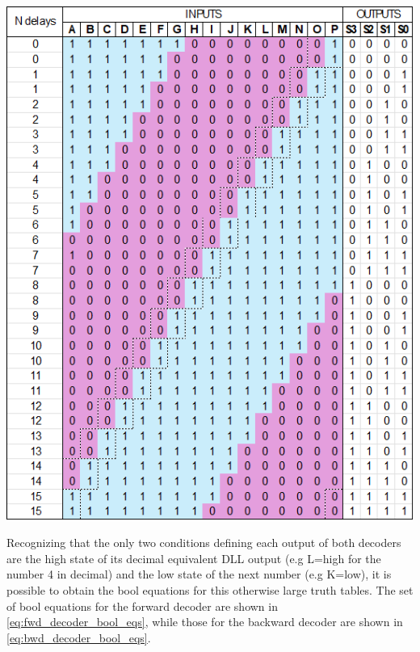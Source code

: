 \begin{minipage}{0.48\textwidth}
    \centering
    \includegraphics[width=1\textwidth]{figures/bwd_truth_table.png}
    \label{tab:bwd_truth_table}
\end{minipage}

Recognizing that the only two conditions defining each output of both decoders are the high state of its decimal equivalent DLL output (e.g L=high for the number 4 in decimal) and the low state of the next number
(e.g K=low), it is possible to obtain the bool equations for this otherwise large truth tables. The set of bool equations for the forward decoder are shown in \ref{eq:fwd_decoder_bool_eqs}, while those for
the backward decoder are shown in \ref{eq:bwd_decoder_bool_eqs}.

\vspace{1cm}

